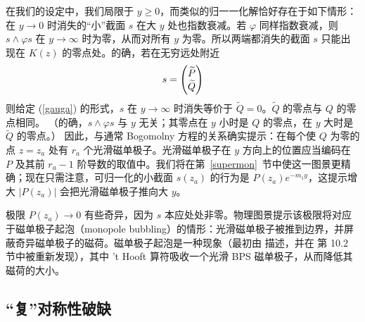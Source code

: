 在我们的设定中，我们局限于 $y\geq 0$，而类似的归一一化解恰好存在于如下情形：在 $y\to 0$ 时消失的“小”截面 $s$ 在大 $y$ 处也指数衰减。若 $\varphi$ 同样指数衰减，则 $s\wedge \varphi s$ 在 $y\to\infty$ 时为零，从而对所有 $y$ 为零。所以两端都消失的截面 $s$ 只能出现在 $K(z)$ 的零点处。的确，若在无穷远处附近
\begin{equation}\label{sinfty}s=\begin{pmatrix} \tilde P\cr \tilde Q\end{pmatrix}\end{equation}
则给定 (\ref{gauga}) 的形式，$s$ 在 $y\to \infty$ 时消失等价于 $\tilde Q=0$。$\tilde Q$ 的零点与 $Q$ 的零点相同。
（的确，$s\wedge \varphi s$ 与 $y$ 无关；其零点在 $y$ 小时是 $Q$ 的零点，在 $y$ 大时是 $\tilde Q$ 的零点。）
因此，与通常 Bogomolny 方程的关系确实提示：在每个使 $Q$ 为零的点 $z=z_a$ 处有 $r_a$ 个光滑磁单极子。光滑磁单极子在 $y$ 方向上的位置应当编码在 $P$ 及其前 $r_a-1$ 阶导数的取值中。我们将在第~\ref{supermon}~节中使这一图景更精确；现在只需注意，可归一化的小截面 $s(z_a)$ 的行为是 $P(z_a) e^{ -m_1 y}$，这提示增大 $|P(z_a)|$ 会把光滑磁单极子推向大 $y$。

极限 $P(z_a) \to 0$ 有些奇异，因为 $s$ 本应处处非零。物理图景提示该极限将对应于磁单极子起泡（monopole bubbling）的情形：光滑磁单极子被推到边界，并屏蔽奇异磁单极子的磁荷。磁单极子起泡是一种现象（最初由 \cite{Kronheimer} 描述，并在 \cite{KW} 第 10.2 节中被重新发现），其中 't Hooft 算符吸收一个光滑 BPS 磁单极子，从而降低其磁荷的大小。

\subsection{“复”对称性破缺}\label{simvar}


